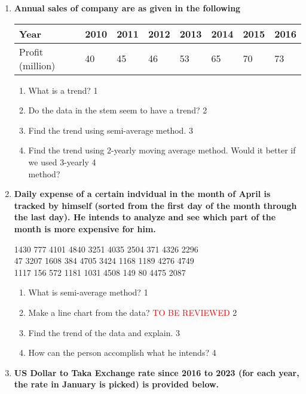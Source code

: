 \documentclass[a4paper,oneside]{book}
\begin{document}
\begin{enumerate}
 \item
	  \textbf{Annual sales of company are as given in the following}\
	  
	  \begin{table}[h]
	  \centering
\begin{tabular}{l|l|l|l|l|l|l|l}
Year & 2010 & 2011 & 2012 & 2013 & 2014 & 2015 & 2016 \\ \hline
Profit (million) & 40 & 45 & 46 & 53 & 65 & 70 & 73
\end{tabular}
\end{table}

  \begin{enumerate}
    \item
	What is a trend? \hfill 1
    \item
	Do the data in the stem seem to have a trend? \hfill 2
    \item  
	Find the trend using semi-average method. \hfill 3
    \item
	Find the trend using 2-yearly moving average method. Would it better if we used 3-yearly  \hfill 4 \\  method?
\end{enumerate}

 \item
	  \textbf{Daily expense of a certain indvidual in the month of April is tracked by himself (sorted from the first day of the month through the last day). He intends to analyze and see which part of the month is more expensive for him.}
	  
	  \begin{center}
1430  777 4101 4840 3251 4035 2504  371 4326 2296 \\
47 3207 1608  384 4705 3424 1168 1189 4276 4749 \\
1117  156  572 1181 1031 4508  149   80 4475 2087
\end{center}
  
  \begin{enumerate}
    \item
	What is semi-average method? \hfill 1
    \item
	Make a line chart from the data? \textcolor{red}{TO BE REVIEWED} \hfill 2
    \item  
	Find the trend of the data and explain. \hfill 3
    \item
	How can the person accomplish what he intends? \hfill 4
  \end{enumerate}
  
  \item
	  \textbf{US Dollar to Taka Exchange rate since 2016 to 2023 (for each year, the rate in January is picked) is provided below. } 
  

\end{enumerate}
\end{document}
